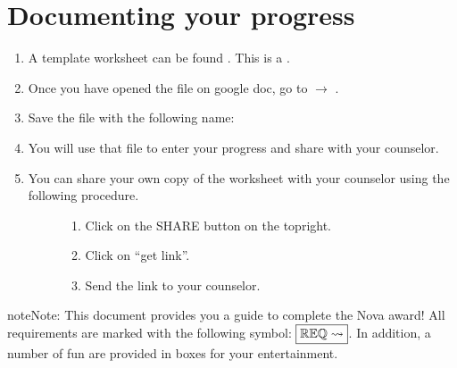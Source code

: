 \documentclass[letterpaper,10pt,english,openany,oneside]{sphinxmanual}
\begin{document}
\section{Documenting your progress}
\label{\detokenize{introduction:documenting-your-progress}}\begin{enumerate}
%
\item {} 
A template worksheet can be found . This is a . 

\item {} 
Once you have opened the file on google doc, go to  \(\rightarrow\) .

\item {} 
Save the file with the following name: 

\item {} 
You will use that file to enter your progress and share with your counselor.

\item {} \begin{description}
\item[{You can share your own copy of the worksheet with your counselor using the following procedure.}] \leavevmode\begin{enumerate}
%
\item {} 
Click on the SHARE button on the top\sphinxhyphen{}right.

\item {} 
Click on “get link”.

\item {} 
Send the link to your counselor.

\end{enumerate}

\end{description}

\end{enumerate}

\begin{sphinxadmonition}{note}{Note:}
This document provides you a guide to complete the Nova award! All requirements are marked with the following symbol: \(\boxed{\mathbb{REQ}\Large \rightsquigarrow}\). In addition, a number of fun  are provided in boxes for your entertainment.
\end{sphinxadmonition}
\end{document}
